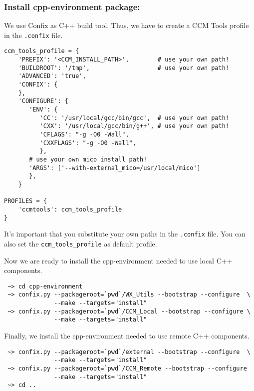 \subsubsection{Install cpp-environment package:}
We use Confix as C++ build tool. Thus, we have to create a CCM Tools profile
in the {\tt .confix} file.
\begin{small}
\begin{verbatim}
ccm_tools_profile = {
    'PREFIX': '<CCM_INSTALL_PATH>',        # use your own path!
    'BUILDROOT': '/tmp',                   # use your own path!
    'ADVANCED': 'true',
    'CONFIX': {
    },
    'CONFIGURE': {
       'ENV': {
          'CC': '/usr/local/gcc/bin/gcc',  # use your own path!
          'CXX': '/usr/local/gcc/bin/g++', # use your own path!    
          'CFLAGS': "-g -O0 -Wall",
          'CXXFLAGS': "-g -O0 -Wall",
          },
       # use your own mico install path!
       'ARGS': ['--with-external_mico=/usr/local/mico']
       },
    }

PROFILES = {
    'ccmtools': ccm_tools_profile
}
\end{verbatim}
\end{small}
It's important that you substitute your own paths in the {\tt .confix} file.
You can also set the {\tt ccm\_tools\_profile} as default profile.

Now we are ready to install the cpp-environment needed to use local C++ components.
\begin{small}
\begin{verbatim}
 ~> cd cpp-environment
 ~> confix.py --packageroot=`pwd`/WX_Utils --bootstrap --configure  \
              --make --targets="install"
 ~> confix.py --packageroot=`pwd`/CCM_Local --bootstrap --configure \
              --make --targets="install"
\end{verbatim}
\end{small}

Finally, we install the cpp-environment needed to use remote C++
components.

\begin{small}
\begin{verbatim}
 ~> confix.py --packageroot=`pwd`/external --bootstrap --configure  \
              --make --targets="install" 
 ~> confix.py --packageroot=`pwd`/CCM_Remote --bootstrap --configure 
              --make --targets="install"
 ~> cd ..
\end{verbatim}
\end{small}
 
